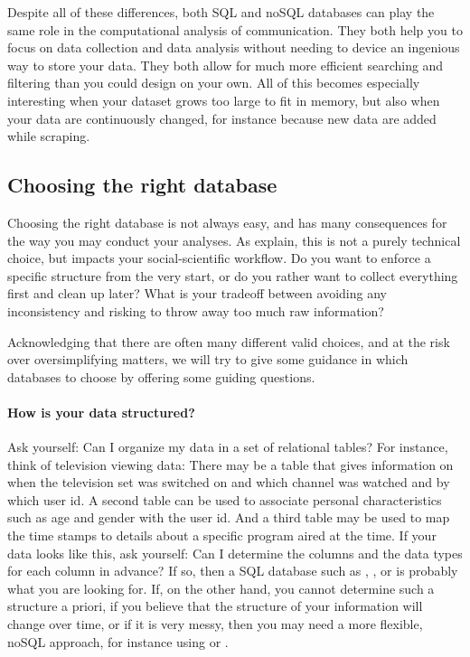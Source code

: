 Despite all of these differences, both SQL and noSQL databases can play
the same role in the computational analysis of communication. They both
help you to focus on data collection and data analysis without needing
to device an ingenious way to store your data. They both allow for much
more efficient searching and filtering than you could design on your own.
All of this becomes especially interesting when your dataset grows too
large to fit in memory, but also when your data are continuously changed,
for instance because new data are added while scraping.


\subsection{Choosing the right database}
Choosing the right database is not always easy, and has many consequences
for the way you may conduct your analyses. As \citet{Gunther2018} explain,
this is not a purely technical choice, but impacts your social-scientific
workflow. Do you want to enforce a specific structure from the very
start, or do you rather want to collect everything first and clean up
later? What is your tradeoff between avoiding any inconsistency and risking
to throw away too much raw information? 

Acknowledging that there are often many different valid choices, and at
the risk over oversimplifying matters, we will try to give some guidance
in which databases to choose by offering some guiding questions.


\paragraph{How is your data structured?} Ask yourself: Can I organize my data
in a set of relational tables? For instance, think of television
viewing data: There may be a table that gives information on when the
television set was switched on and which channel was watched and by
which user id. A second table can be used to associate personal
characteristics such as age and gender with the user id. And a third
table may be used to map the time stamps to details about a specific
program aired at the time.  If your data looks like this, ask
yourself: Can I determine the columns and the data types for each
column in advance?  If so, then a SQL database such as ,
, or  is probably what you are looking
for. If, on the other hand, you cannot determine such a structure a
priori, if you believe that the structure of your information will
change over time, or if it is very messy, then you may need a more
flexible, noSQL approach, for instance using  or
.

